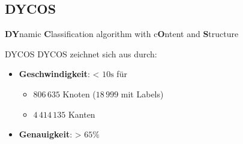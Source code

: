 \subsection{DYCOS}
\begin{frame}{}
    \begin{center}
    \Huge
    \textbf{DY}namic \textbf{C}lassification algorithm with
    c\textbf{O}ntent and \textbf{S}tructure
    \end{center}
\end{frame}

\begin{frame}{DYCOS}
    DYCOS zeichnet sich aus durch:
    \begin{itemize}
        \item \textbf{Geschwindigkeit}: < $10\si{\second}$ für
            \begin{itemize}
                \item $806\,635$ Knoten ($18\,999$ mit Labels)
                \item $4\,414\,135$ Kanten
            \end{itemize}
        \item \textbf{Genauigkeit}: > $65\%$
    \end{itemize}
\end{frame}




